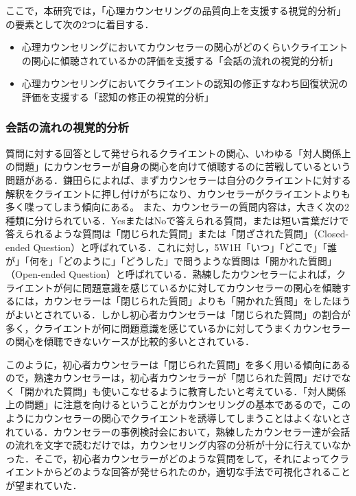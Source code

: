 \documentclass[shuuron]{kuee}
\begin{document}
ここで，本研究では，「心理カウンセリングの品質向上を支援する視覚的分析」の要素として次の2つに着目する．
\begin{itemize}
  \item 心理カウンセリングにおいてカウンセラーの関心がどのくらいクライエントの関心に傾聴されているかの評価を支援する「会話の流れの視覚的分析」
  \item 心理カウンセリングにおいてクライエントの認知の修正すなわち回復状況の評価を支援する「認知の修正の視覚的分析」
\end{itemize}



\subsubsection{会話の流れの視覚的分析}




質問に対する回答として発せられるクライエントの関心、いわゆる「対人関係上の問題」にカウンセラーが自身の関心を向けて傾聴するのに苦戦しているという問題がある．鎌田ら\cite{Darshana}によれば、まずカウンセラーは自分のクライエントに対する解釈をクライエントに押し付けがちになり、カウンセラーがクライエントよりも多く喋ってしまう傾向にある。
また、カウンセラーの質問内容は，大きく次の2種類に分けられている．YesまたはNoで答えられる質問，または短い言葉だけで答えられるような質問は「閉じられた質問」または「閉ざされた質問」（Closed-ended Question）と呼ばれている．これに対し，5W1H「いつ」「どこで」「誰が」「何を」「どのように」「どうした」で問うような質問は「開かれた質問」（Open-ended Question）と呼ばれている．熟練したカウンセラーによれば，クライエントが何に問題意識を感じているかに対してカウンセラーの関心を傾聴するには，カウンセラーは「閉じられた質問」よりも「開かれた質問」をしたほうがよいとされている\cite{ivey}．しかし初心者カウンセラーは「閉じられた質問」の割合が多く，クライエントが何に問題意識を感じているかに対してうまくカウンセラーの関心を傾聴できないケースが比較的多いとされている．

このように，初心者カウンセラーは「閉じられた質問」を多く用いる傾向にあるので，熟達カウンセラーは，初心者カウンセラーが「閉じられた質問」だけでなく「開かれた質問」も使いこなせるように教育したいと考えている．「対人関係上の問題」に注意を向けるということがカウンセリングの基本であるので，このようにカウンセラーの関心でクライエントを誘導してしまうことはよくないとされている．カウンセラーの事例検討会において，熟練したカウンセラー達が会話の流れを文字で読むだけでは，カウンセリング内容の分析が十分に行えていなかった．そこで，初心者カウンセラーがどのような質問をして，それによってクライエントからどのような回答が発せられたのか，適切な手法で可視化されることが望まれていた．
\end{document}
